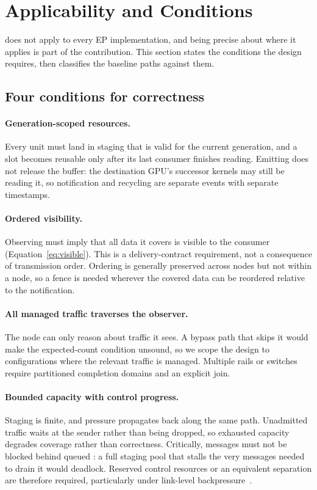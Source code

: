 \section{Applicability and Conditions}
\label{sec:limits}
\sys{} does not apply to every EP implementation, and being precise about where it
applies is part of the contribution. This section states the conditions the design
requires, then classifies the baseline paths against them.

\subsection{Four conditions for correctness}
\label{sec:conditions}
\paragraph{Generation-scoped resources.}
Every \data{} unit must land in staging that is valid for the current generation, and a
slot becomes reusable only after its last consumer finishes reading. Emitting \done{}
does not release the buffer: the destination GPU's successor kernels may still be
reading it, so notification and recycling are separate events with separate timestamps.

\paragraph{Ordered visibility.}
Observing \done{} must imply that all data it covers is visible to the consumer
(Equation~\eqref{eq:visible}). This is a delivery-contract requirement, not a
consequence of transmission order. Ordering is generally preserved across nodes but not
within a node, so a fence is needed wherever the covered data can be reordered relative
to the notification.

\paragraph{All managed traffic traverses the observer.}
The node can only reason about traffic it sees. A bypass path that skips it would make
the expected-count condition unsound, so we scope the design to configurations where the
relevant traffic is managed. Multiple rails or switches require partitioned completion
domains and an explicit join.

\paragraph{Bounded capacity with control progress.}
Staging is finite, and pressure propagates back along the same path. Unadmitted traffic
waits at the sender rather than being dropped, so exhausted capacity degrades coverage
rather than correctness. Critically, \ready{} messages must not be blocked behind queued
\data{}: a full staging pool that stalls the very messages needed to drain it would
deadlock. Reserved control resources or an equivalent separation are therefore required,
particularly under link-level backpressure~\cite{pfc}.

